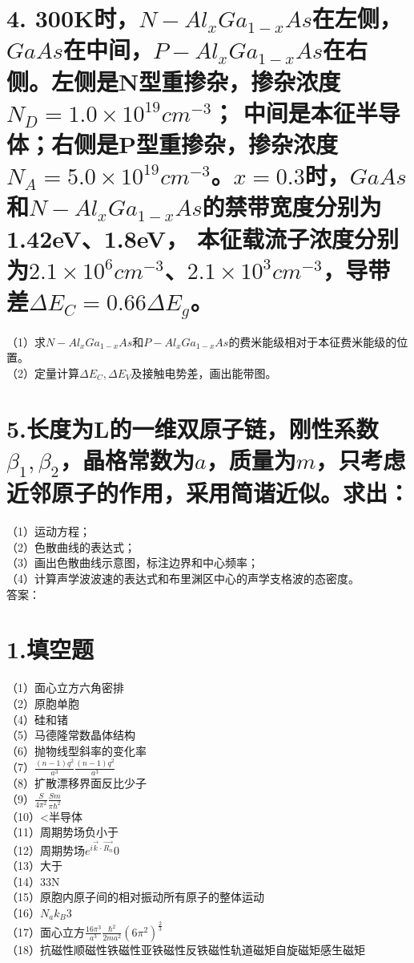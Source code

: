 \documentclass[UTF8]{ctexart}
\begin{document}
\section*{4. 300K时，$N-Al_xGa_{1-x}As$在左侧，$GaAs$在中间，$P-Al_xGa_{1-x}As$在右侧。左侧是N型重掺杂，掺杂浓度$N_D=1.0\times10^{19}cm^{-3}$；
中间是本征半导体；右侧是P型重掺杂，掺杂浓度$N_A=5.0\times10^{19}cm^{-3}$。$x=0.3$时，$GaAs$和$N-Al_xGa_{1-x}As$的禁带宽度分别为1.42eV、1.8eV，
本征载流子浓度分别为$2.1\times10^6cm^{-3}$、$2.1\times10^3cm^{-3}$，导带差$\Delta E_C=0.66\Delta E_g$。}
（1）求$N-Al_xGa_{1-x}As$和$P-Al_xGa_{1-x}As$的费米能级相对于本征费米能级的位置。\\
（2）定量计算$\Delta E_C,\Delta E_V$及接触电势差，画出能带图。\\
\section*{5.长度为L的一维双原子链，刚性系数$\beta_1, \beta_2$，晶格常数为$a$，质量为$m$，只考虑近邻原子的作用，采用简谐近似。求出：}
（1）运动方程；\\
（2）色散曲线的表达式；\\
（3）画出色散曲线示意图，标注边界和中心频率；\\
（4）计算声学波波速的表达式和布里渊区中心的声学支格波的态密度。\\





答案：
\section*{1.填空题}
（1）面心立方六角密排\\
（2）原胞单胞\\
（4）硅和锗\\
（5）马德隆常数晶体结构\\
（6）抛物线型斜率的变化率\\
（7）$\frac{(n-1)q^2}{a^3}$$\frac{(n-1)q^2}{a^3}$\\
（8）扩散漂移界面反比少子\\
（9）$\frac{S}{4\pi^2}$$\frac{Sm}{\pi\hbar^2}$\\
（10）<半导体\\
（11）周期势场负小于\\
（12）周期势场$e^{i\vec{k}\cdot\vec{R_n}}$0\\
（13）大于\\
（14）33N\\
（15）原胞内原子间的相对振动所有原子的整体运动\\
（16）$N_ak_B$3\\
（17）面心立方$\frac{16\pi^3}{a^3}$$\frac{\hbar^2}{2ma^2}(6\pi^2)^{\frac{2}{3}}$\\
（18）抗磁性顺磁性铁磁性亚铁磁性反铁磁性轨道磁矩自旋磁矩感生磁矩\\
\end{document}
